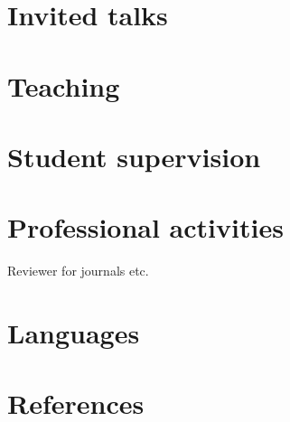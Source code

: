 \documentclass[12pt]{moderncv}
\begin{document}
\section{Invited talks}

\section{Teaching}

\section{Student supervision}

\section{Professional activities}

Reviewer for journals etc.

\section{Languages}


\section{References}
\end{document}
